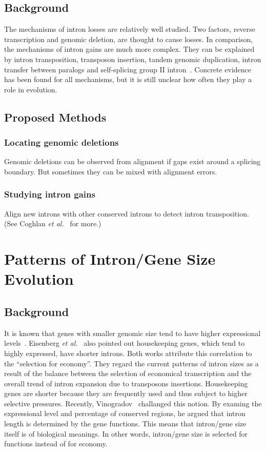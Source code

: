 \subsection{Background}
The mechanisms of intron
losses are relatively well studied. Two factors, reverse transcription
and genomic deletion, are thought to cause losses.
In comparison, the mechanisms of intron gains are much more complex.
They can be explained by intron transposition, transposon insertion,
tandem genomic duplication, intron transfer between paralogs and self-splicing group II intron~\cite{roy06,coghlan04}.
Concrete evidence has been found for all mechanisms,
but it is still unclear how often they play a role in evolution.

\subsection{Proposed Methods}
\subsubsection{Locating genomic deletions}
Genomic deletions can be observed from alignment if gaps exist around a splicing boundary.
But sometimes they can be mixed with alignment errors.
\subsubsection{Studying intron gains}
Align new introns with other conserved introns to detect intron transposition.
(See Coghlan {\it et al.}~\cite{coghlan04} for more.)

\section{Patterns of Intron/Gene Size Evolution}

\subsection{Background}
It is known that genes with smaller genomic size
tend to have higher expressional levels~\cite{castilloDavis02,urrutia03}.
Eisenberg {\it et al.}~\cite{eisenberg03} also pointed out housekeeping genes, which tend to highly expressed, have shorter introns.
Both works attribute this correlation to the ``selection for economy''.
They regard the current patterns of intron sizes as a result of the balance between the selection
of economical transcription and the overall trend of intron expansion due to
transposons insertions. Housekeeping genes are shorter because they are frequently
used and thus subject to higher selective pressures. Recently, Vinogradov~\cite{vinogradov06}
challanged this notion. By examing the expressional level and percentage of conserved regions,
he argued that intron length is determined by the gene functions. This means that intron/gene size
itself is of biological meanings. In other words, intron/gene size is selected for functions
instead of for economy.

